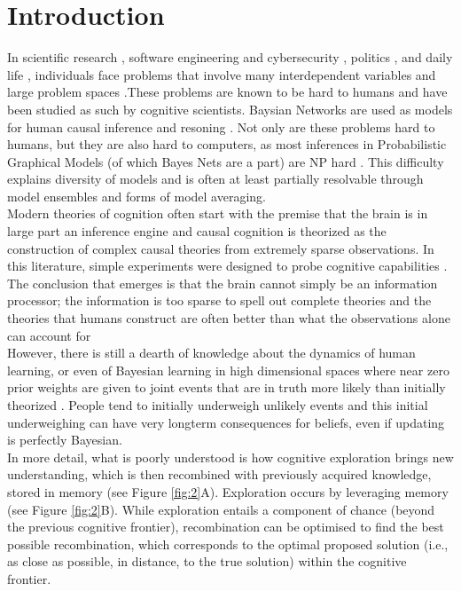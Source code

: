 \section{Introduction}
In scientific research \cite{hisano2013challenges}, software engineering and cybersecurity \cite{littlewood1989predicting,maillart2017given}, politics \cite{clinton2014hard}, and daily life \cite{gerson1986hard}, individuals face problems that involve many interdependent variables and large problem spaces \cite{koller09, Pearl2009CMR}.These problems are known to be hard to humans and have been studied as such by cognitive scientists. Baysian Networks are used as models for human causal inference and resoning \cite{bramley2015staying, castnerForthcoming, Griffiths2008, Pearl88, Spiegler2016, spiegler2015}. Not only are these problems hard to humans, but they are also hard to computers, as most inferences in Probabilistic Graphical Models (of which Bayes Nets are a part) are NP hard \cite{koller09}. This difficulty explains diversity of models and is often at least partially resolvable through model ensembles and forms of model averaging.\\ 

Modern theories of cognition often start with the premise that the brain is in large part an inference engine \cite{Tenenbaum06theory-basedbayesian} and causal cognition is theorized as the construction of complex causal theories from extremely sparse observations. In this literature, simple experiments were designed to probe cognitive capabilities \cite{tenenbaum2001structure}. The conclusion that emerges is that the brain cannot simply be an information processor; the information is too sparse to spell out complete theories and the theories that humans construct are often better than what the observations alone can account for \cite{ortoleva2012modeling, Hong04} \\

However, there is still a dearth of knowledge about the dynamics of human learning, or even of Bayesian learning in high dimensional spaces where near zero prior weights are given to joint events that are in truth more likely than initially theorized \cite{ortoleva2012modeling}. People tend to initially underweigh unlikely events \cite{taleb2007} and this initial underweighing can have very longterm consequences for beliefs, even if updating is perfectly Bayesian.\\

In more detail, what is poorly understood is how cognitive exploration brings new understanding, which is then recombined with previously acquired knowledge, stored in memory (see Figure \ref{fig:2}A). Exploration occurs by leveraging memory (see Figure \ref{fig:2}B). While exploration entails a component of chance (beyond the previous cognitive frontier), recombination can be optimised to find the best possible recombination, which corresponds to the optimal proposed solution (i.e., as close as possible, in distance, to the true solution) within the cognitive frontier.\\

